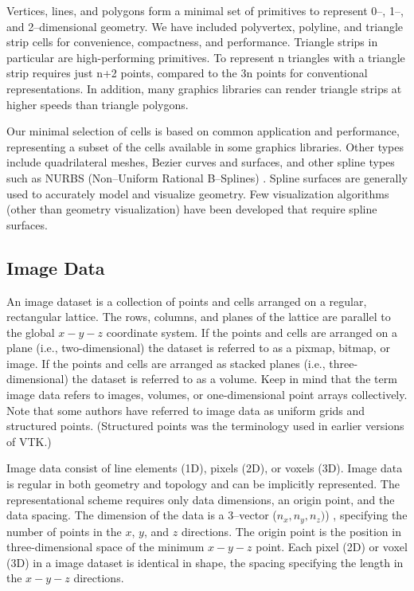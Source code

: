 Vertices, lines, and polygons form a minimal set of primitives to represent 0--, 1--, and 2--dimensional geometry. We have included polyvertex, polyline, and triangle strip cells for convenience, compactness, and performance. Triangle strips in particular are high-performing primitives. To represent n triangles with a triangle strip requires just n+2 points, compared to the 3n points for conventional representations. In addition, many graphics libraries can render triangle strips at higher speeds than triangle polygons.

Our minimal selection of cells is based on common application and performance, representing a subset of the cells available in some graphics libraries. Other types include quadrilateral meshes, Bezier curves and surfaces, and other spline types such as NURBS (Non--Uniform Rational B--Splines) \cite{Mortenson85}. Spline surfaces are generally used to accurately model and visualize geometry. Few visualization algorithms (other than geometry visualization) have been developed that require spline surfaces.

\subsection{Image Data}
\label{subsec:image_data}

An image dataset is a collection of points and cells arranged on a regular, rectangular lattice. The rows, columns, and planes of the lattice are parallel to the global $x-y-z$ coordinate system. If the points and cells are arranged on a plane (i.e., two-dimensional) the dataset is referred to as a pixmap, bitmap, or image. If the points and cells are arranged as stacked planes (i.e., three-dimensional) the dataset is referred to as a volume. Keep in mind that the term image data refers to images, volumes, or one-dimensional point arrays collectively. Note that some authors have referred to image data as uniform grids and structured points. (Structured points was the terminology used in earlier versions of VTK.)

Image data consist of line elements (1D), pixels (2D), or voxels (3D). Image data is regular in both geometry and topology and can be implicitly represented. The representational scheme requires only data dimensions, an origin point, and the data spacing. The dimension of the data is a 3--vector ($n_x,n_y,n_z)$) , specifying the number of points in the $x$, $y$, and $z$ directions. The origin point is the position in three-dimensional space of the minimum $x-y-z$ point. Each pixel (2D) or voxel (3D) in a image dataset is identical in shape, the spacing specifying the length in the $x-y-z$ directions.

